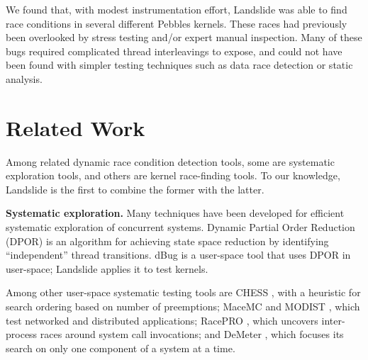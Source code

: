 \documentclass{llncs}
\begin{document}
We found that, with modest instrumentation effort, Landslide was able to find race conditions in several different Pebbles kernels. These races had previously been overlooked by stress testing and/or expert manual inspection.
Many of these bugs required complicated thread interleavings to expose, and could not have been found with simpler testing techniques such as data race detection or static analysis.


\squish
\section{Related Work}
\squish

Among related dynamic race condition detection tools, some are systematic exploration tools, and others are kernel race-finding tools. To our knowledge, Landslide is the first to combine the former with the latter.

{\bf Systematic exploration.} Many techniques have been developed for efficient systematic exploration of concurrent systems. Dynamic Partial Order Reduction (DPOR) \cite{dpor} is an algorithm for achieving state space reduction by identifying ``independent'' thread transitions. dBug \cite{dbug-ssv} is a user-space tool that uses DPOR in user-space; Landslide applies it to test kernels.

Among other user-space systematic testing tools are CHESS \cite{chess}, with a heuristic for search ordering based on number of preemptions; MaceMC \cite{macemc} and MODIST \cite{modist}, which test networked and distributed applications; RacePRO \cite{racepro}, which uncovers inter-process races around system call invocations; and DeMeter \cite{demeter}, which focuses its search on only one component of a system at a time.
\end{document}
